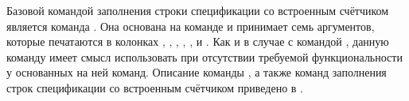 Базовой командой заполнения строки спецификации со встроенным счётчиком является команда
. Она основана на команде  и
принимает семь аргументов, которые печатаются в колонках
\colorbox{resultcolor}{}, \colorbox{resultcolor}{},
\colorbox{resultcolor}{}, \colorbox{resultcolor}{},
\colorbox{resultcolor}{}, \colorbox{resultcolor}{} и
\colorbox{resultcolor}{}. Как и в случае с командой
, данную команду имеет смысл использовать при отсутствии
требуемой функциональности у основанных на ней команд. Описание команды
, а также команд заполнения строк спецификации со
встроенным счётчиком приведено в .

\clearpage


